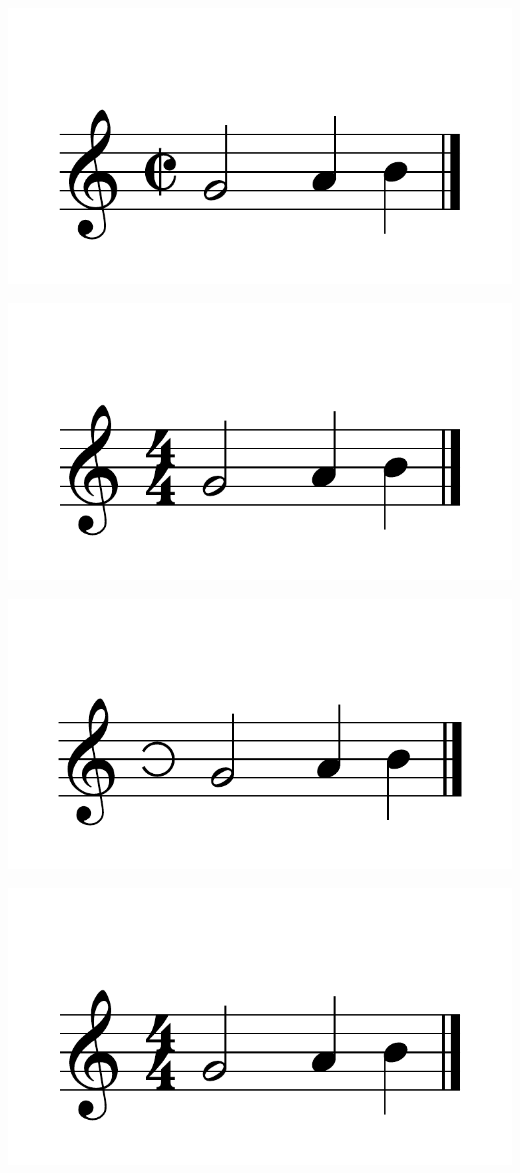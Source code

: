 \documentclass{article}
\begin{document}
\includegraphics[scale=0.5]{figures_tests/pdf/skern/commonmeter2.pdf}

\includegraphics[scale=0.5]{figures_tests/pdf/skern/commonmeter3.pdf}

\includegraphics[scale=0.5]{figures_tests/pdf/skern/commonmeter4.pdf}


\includegraphics[scale=0.5]{figures_tests/pdf/skern/perfectmeter1.pdf}
\end{document}
